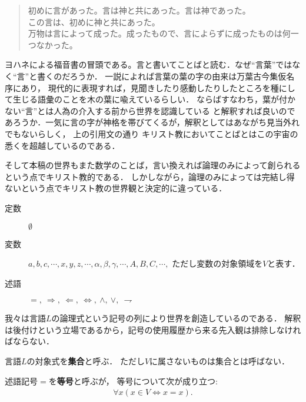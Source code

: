 	\begin{quote}
		初めに言があった。言は神と共にあった。言は神であった。\\
		この言は、初めに神と共にあった。\\
		万物は言によって成った。成ったもので、言によらずに成ったものは何一つなかった。
	\end{quote}
	ヨハネによる福音書の冒頭である。言と書いてことばと読む．なぜ``言葉''ではなく``言''と書くのだろうか．
	一説によれば言葉の葉の字の由来は万葉古今集仮名序にあり，
	現代的に表現すれば，見聞きしたり感動したりしたところを種にして生じる語彙のことを木の葉に喩えているらしい．
	ならばすなわち，葉が付かない``言''とは人為の介入する前から世界を認識している
	と解釈すれば良いのであろうか．一気に言の字が神格を帯びてくるが，解釈としてはあながち見当外れでもないらしく，
	上の引用文の通り%
	キリスト教においてことばとはこの宇宙の悉くを超越しているのである．
	\begin{comment}
		実際に自然言語の発生が事物の観測なしに起こり得たかという問題は言語哲学上も決着がついていないらしいが，
		少なくとも
	\end{comment}
	そして本稿の世界もまた数学のことば，言い換えれば論理のみによって創られるという点でキリスト教的である．
	しかしながら，論理のみによっては完結し得ないという点でキリスト教の世界観と決定的に違っている．
	
	
	\begin{description}
		\item[定数] $\emptyset$
		\item[変数] $a,b,c,\cdots,x,y,z,\cdots,\alpha,\beta,\gamma,\cdots,A,B,C,\cdots,$
			ただし変数の対象領域を$V$と表す．
		\item[述語] $=,\ \Longrightarrow,\ \Longleftarrow,\ \Longleftrightarrow,
			\ \wedge,\ \vee,\ \rightharpoondown$
	\end{description}
	
	我々は言語$L$の論理式という記号の列により世界を創造しているのである．
	解釈は後付けという立場であるから，記号の使用履歴から来る先入観は排除しなければならない．
	\begin{screen}
		\begin{dfn}[集合]
			言語$L$の対象式を{\bf 集合}と呼ぶ．
			ただし$V$に属さないものは集合とは呼ばない．
		\end{dfn}
	\end{screen}
	
	\begin{screen}
		\begin{axm}[等号の公理]
			述語記号$=$を{\bf 等号}\index{とうごう@等号}{\bf (equal sign)}と呼ぶが，
			等号について次が成り立つ:
			\begin{align}
				\forall x (x \in V \Longleftrightarrow x=x).
			\end{align}
		\end{axm}
	\end{screen}
	
